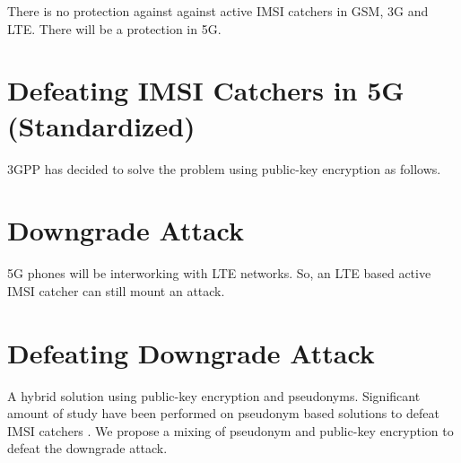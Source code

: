 \documentclass[portrait,a0]{a0poster}
\begin{document}
\begin{multicols}{2}
\begin{center}
    
\end{center}

\begin{Large} There is no protection against against active IMSI catchers in GSM, 3G and LTE. There will be a protection in 5G. \end{Large}

\section{Defeating IMSI Catchers in 5G (Standardized)}
\begin{Large} 3GPP has decided to solve the problem using public-key encryption as follows. \end{Large}
\begin{center}
    
\end{center}



\section{Downgrade Attack}
\begin{Large} 5G phones will be interworking with LTE networks. So, an LTE based active IMSI catcher can still mount an attack.\end{Large}
\begin{center}
    
\end{center}


\section{Defeating Downgrade Attack}
\begin{large}
 A hybrid solution using public-key encryption and pseudonyms. Significant amount of study have been performed on pseudonym based solutions to defeat IMSI catchers \cite{Norrman_Naslund_Dubrova_2016,Ginzboorg_Niemi_2016,CCS15,SSR15}. We propose a mixing of pseudonym and public-key encryption to defeat the downgrade attack.
\end{large}


\begin{center}
    
\end{center}







\end{multicols}

\vfill %

\begin{minipage}[t]{0.9\linewidth} %
\footnotesize
{}
\end{minipage}
\end{document}
